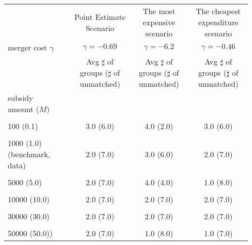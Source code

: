 \begin{tabular}{@{\extracolsep{5pt}}lcccc}
\toprule 
 &  & Point Estimate Scenario & The most expensive scenario & The cheapest expenditure scenario \\
merger cost $\gamma$ &  & $\gamma=-0.69$ & $\gamma=-6.2$ & $\gamma=-0.46$ \\
 &  & Avg $\sharp$ of groups ($\sharp$ of unmatched) & Avg $\sharp$ of groups ($\sharp$ of unmatched) & Avg $\sharp$ of groups ($\sharp$ of unmatched) \\
\midrule 
subsidy amount ($M$) &  &  &  &  \\
 &  &  &  &  \\
100 (0.1) &  & 3.0 (6.0) & 4.0 (2.0) & 3.0 (6.0) \\
 &  &  &  &  \\
1000 (1.0) (benchmark, data) &  & 2.0 (7.0) & 3.0 (6.0) & 2.0 (7.0) \\
 &  &  &  &  \\
5000 (5.0) &  & 2.0 (7.0) & 4.0 (4.0) & 1.0 (8.0) \\
 &  &  &  &  \\
10000 (10.0) &  & 2.0 (7.0) & 2.0 (7.0) & 2.0 (7.0) \\
 &  &  &  &  \\
30000 (30.0) &  & 2.0 (7.0) & 2.0 (7.0) & 2.0 (7.0) \\
 &  &  &  &  \\
50000 (50.0)) &  & 2.0 (7.0) & 1.0 (8.0) & 1.0 (7.0) \\
\hline 
\bottomrule 
\end{tabular}
